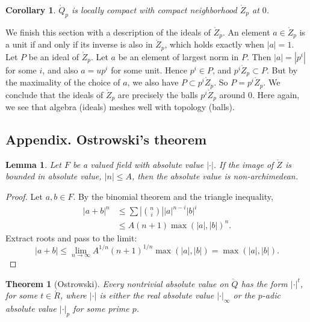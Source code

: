 \documentclass{amsart}
\newtheorem{theorem}[equation]{Theorem}
\newtheorem{lemma}[equation]{Lemma}
\newtheorem{corollary}[equation]{Corollary}
\def\abs#1{{|#1|}}
\def\RR{\ring{R}}
\begin{document}
\begin{corollary} $\ring{Q}_p$ is locally compact with compact
  neighborhood $\ring{Z}_p$ at $0$.
\end{corollary}

We finish this section with a description of the ideals of
$\ring{Z}_p$.  An element $a\in\ring{Z}_p$ is a unit if and only if
its inverse is also in $\ring{Z}_p$, which holds exactly when
$\abs{a}=1$.  Let $P$ be an ideal of $\ring{Z}_p$.  Let $a$ be an
element of largest norm in $P$.  Then $\abs{a}=\abs{p^i}$ for some
$i$, and also $a = u p^i$ for some unit.  Hence $p^i \in P$, and
$p^i\ring{Z}_p\subset P$.  But by the maximality of the choice of $a$,
we also have $P\subset p^i\ring{Z}_p$.  So $P=p^i\ring{Z}_p$.  We
conclude that the ideals of $\ring{Z}_p$ are precisely the balls
$p^i\ring{Z}_p$ around $0$.  Here again, we see that algebra (ideals)
meshes well with topology (balls).

\newpage
\subsection{Appendix. Ostrowski's theorem}

\begin{lemma} Let $F$ be a valued field with absolute value $\abs{\cdot}$.
If the image of $\ring{Z}$ is bounded in absolute value, $\abs{n}\le A$, 
then the absolute
value is non-archimedean.
\end{lemma}

\begin{proof} Let $a,b\in F$.  By the binomial theorem and the
  triangle inequality,
\begin{align*}
\abs{a+b}^n &\le \sum \abs{{n\choose{i}}}\abs{a}^{n-i}\abs{b}^i\\
    &\le A (n+1)\max(\abs{a},\abs{b})^n.
\end{align*}
Extract roots and pass to the limit:
\[
\abs{a+b} \le \lim_{n\to\infty} A^{1/n}(n+1)^{1/n} \max(\abs{a},\abs{b}) 
= \max(\abs{a},\abs{b}).
\]
\end{proof}

\begin{theorem}[Ostrowski] Every nontrivial absolute value on
  $\ring{Q}$ has the form $\abs{\cdot}^t$, for some $t\in\RR$,
  where $\abs{\cdot}$ is either the real absolute value
  $\abs{\cdot}_\infty$ or the $p$-adic absolute value $\abs{\cdot}_p$
  for some prime $p$.
\end{theorem}
\end{document}
